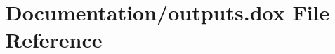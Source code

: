 \hypertarget{outputs_8dox}{}\section{Documentation/outputs.dox File Reference}
\label{outputs_8dox}

